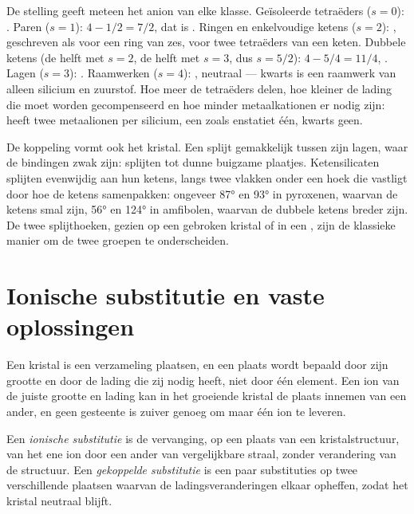 De stelling geeft meteen het anion van elke klasse. Geïsoleerde tetraëders ($s = 0$): . Paren ($s = 1$):
$4 - 1/2 = 7/2$, dat is . Ringen en enkelvoudige ketens ($s = 2$): , geschreven als
 voor een ring van zes,  voor twee tetraëders van een keten. Dubbele ketens (de helft met
$s = 2$, de helft met $s = 3$, dus $s = 5/2$): $4 - 5/4 = 11/4$, . Lagen ($s = 3$): .
Raamwerken ($s = 4$): , neutraal --- kwarts is een raamwerk van alleen silicium en zuurstof. Hoe meer de tetraëders
delen, hoe kleiner de lading die moet worden gecompenseerd en hoe minder metaalkationen er nodig zijn:  
heeft twee metaalionen per silicium, een  zoals enstatiet  één, kwarts geen.

De koppeling vormt ook het kristal. Een  splijt gemakkelijk tussen zijn lagen, waar de bindingen zwak zijn:
 splijten tot dunne buigzame plaatjes. Ketensilicaten splijten evenwijdig aan hun ketens, langs twee vlakken onder een hoek
die vastligt door hoe de ketens samenpakken: ongeveer \ang{87} en \ang{93} in pyroxenen, waarvan de ketens smal zijn, \ang{56} en
\ang{124} in amfibolen, waarvan de dubbele ketens breder zijn. De twee splijthoeken, gezien op een gebroken kristal of in een
, zijn de klassieke manier om de twee groepen te onderscheiden.

\section{Ionische substitutie en vaste oplossingen}

Een kristal is een verzameling plaatsen, en een plaats wordt bepaald door zijn grootte en door de lading die zij nodig heeft,
niet door één element. Een ion van de juiste grootte en lading kan in het groeiende kristal de plaats innemen van een ander, en
geen gesteente is zuiver genoeg om maar één ion te leveren.
\begin{definition}\label{def:b1:rock-forming-minerals:substitution}
Een \emph{ionische substitutie} is de vervanging, op een plaats van een kristalstructuur,
van het ene ion door een ander van vergelijkbare straal, zonder verandering van de structuur. Een \emph{gekoppelde
substitutie} is een paar substituties op twee verschillende plaatsen waarvan de
ladingsveranderingen elkaar opheffen, zodat het kristal neutraal blijft.
\end{definition}

